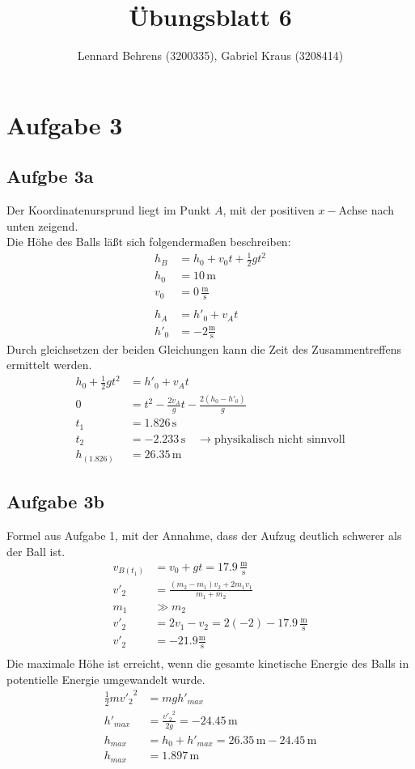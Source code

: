 \documentclass[a4paper,10pt]{extarticle}
\title{Übungsblatt 6}
\author{Lennard Behrens (3200335), Gabriel Kraus (3208414)}
\begin{document}
\maketitle

\section*{Aufgabe 3}
  \subsection*{Aufgbe 3a}
  Der Koordinatenursprund liegt im Punkt $A$, mit der positiven $x-$Achse nach unten zeigend. \\ 
  Die Höhe des Balls läßt sich folgendermaßen beschreiben:
  \begin{align*}
  h_B &= h_0 + v_0 t + \frac{1}{2}gt^2 \\
  h_0 &= 10 \, \mbox{m} \\ 
  v_0 &= 0 \, \frac{\mbox{m}}{\mbox{s}} \\ \\
  h_A &= h'_0 + v_A t \\
  h'_0 &= -2 \frac{\mbox{m}}{\mbox{s}}
  \end{align*}
  Durch gleichsetzen der beiden Gleichungen kann die Zeit des Zusammentreffens ermittelt werden.
  \begin{align*}
  h_0 + \frac{1}{2}gt^2 &= h'_0 + v_A t \\
  0 &= t^2 - \frac{2 v_A}{g} t - \frac{2(h_0 - h'_0)}{g} \\
  t_1 &= 1.826 \, \mbox{s} \\
  t_2 &= -2.233 \, \mbox{s} \quad \rightarrow \mbox{physikalisch nicht sinnvoll}\\
  h_{(1.826)} &= 26.35\, \mbox{m}
  \end{align*}

  \subsection*{Aufgabe 3b}
  Formel aus Aufgabe 1, mit der Annahme, dass der Aufzug deutlich schwerer als der Ball ist.
  \begin{align*}
  v_{B(t_1)} &= v_0 + gt = 17.9 \, \frac{\mbox{m}}{\mbox{s}} \\
  v'_2 &= \frac{(m_2 - m_1)v_2 + 2 m_1 v_1}{m_1 + m_2} \\
  m_1 &\gg m_2 \\
  v'_2 &= 2v_1 - v_2 = 2(-2) - 17.9 \, \frac{\mbox{m}}{\mbox{s}} \\
  v'_2 &= -21.9 \frac{\mbox{m}}{\mbox{s}} \\
  \end{align*}
  Die maximale Höhe ist erreicht, wenn die gesamte kinetische Energie des Balls in potentielle Energie umgewandelt wurde.
  \begin{align*}
  \frac{1}{2} m {v'_2}^2 &= m g h'_{max} \\
  h'_{max} &= \frac{{v'_2}^2}{2g} = -24.45 \, \mbox{m} \\
  h_{max} &= h_0 + h'_{max} = 26.35 \, \mbox{m} - 24.45 \, \mbox{m} \\
  h_{max} &= 1.897 \, \mbox{m}
  \end{align*}
\end{document}
